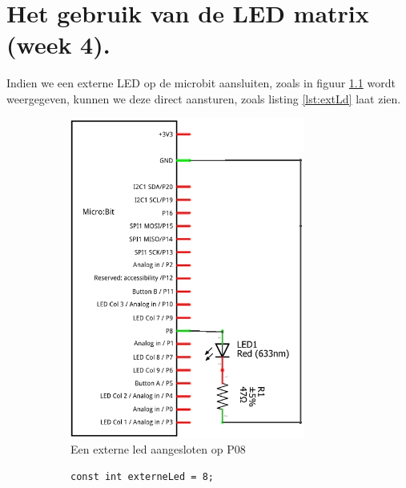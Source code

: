 \chapter{Het gebruik van de LED matrix \normalsize{(week 4)}.}
\label{chap:matrix}

Indien we een externe LED op de microbit aansluiten, zoals in figuur \ref{fig:schemaExLd} wordt weergegeven, kunnen we deze direct aansturen, zoals listing \ref{lst:extLd} laat zien.
\begin{figure}[h!]
	
	\centering
	\begin{center} 	
		\begin{subfigure}[b]{0.43\textwidth}
			\includegraphics[width=0.85\textwidth]{figuren/externeLedCr}
			\caption{Een externe led aangesloten op P08 }
			\label{fig:schemaExLd}
			
		\end{subfigure}
		\begin{subfigure}[b]{0.46\textwidth}
\begin{lstlisting}[caption={Het aansturen van een externe LED.},label={lst:extLd}]
const int externeLed = 8;
				

\end{lstlisting}
\end{subfigure}
\end{center}
\end{figure}
